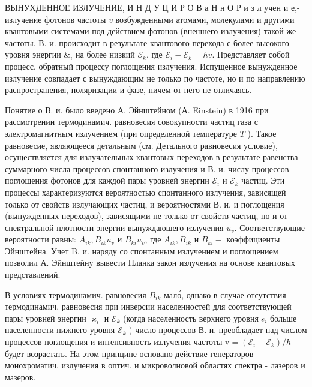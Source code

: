 \documentclass[10pt]{article}
\begin{document}
ВЫНУХДЕННОЕ ИЗЛУЧЕНИЕ, И Н Д У Ц И Р О В а Н н О Р и з л учен и е,- излучение фотонов частоты $v$ возбужденными атомами, молекулами и другими квантовыми системами под действием фотонов (внешнего излучения) такой же частоты. В. и. происходит в результате квантового перехода с более высокого уровня энергии $\mathscr{\&}_{i}$ на более низкий $\mathscr{E}_{k}$, где $\mathscr{E}_{i}-\mathscr{E}_{k}=h v$. Представляет собой процесс, обратный процессу поглощения излучения. Испущенное вынужденное излучение совпадает с вынуждающим не только по частоте, но и по направлению распространения, поляризации и фазе, ничем от него не отличаясь.



Понятие о В. и. было введено А. Эйнштейном (А. Einstein) в 1916 при рассмотрении термодинамич. равновесия совокупности частиц газа с электромагнитным излучением (при определенной температуре $T$ ). Такое равновесие, являющееся детальным (см. Детального равновесия условие), осуществляется для излучательных квантовых переходов в результате равенства суммарного числа процессов спонтанного излучения и В. и. числу процессов поглощения фотонов для каждой пары уровней энергии $\mathscr{E}_{i}$ и $\mathscr{E}_{k}$ частиц. Эти процессы характеризуются вероятностью спонтанного излучения, зависящей только от свойств излучающих частиц, и вероятностями В. и. и поглощения (вынужденных переходов), зависящими не только от свойств частиц, но и от спектральной плотности энергии вынуждаюшего излучения $u_{v}$. Соответствующие вероятности равны: $A_{i k}, B_{i k} u_{v}$ и $B_{k i} u_{v}$, где $A_{i k}, B_{i k}$ и $B_{k i}-$ коэффициенты Эйнштейна. Учет B. и. наряду со спонтанным излучением и поглощением позволил А. Эйнштейну вывести Планка закон излучения на основе квантовых представлений.



В условиях термодинамич. равновесия $B_{i k}$ мало́, однако в случае отсутствия термодинамич. равновесия при инверсии населенностей для соответствующей пары уровней энергии $\mathscr{\varkappa}_{i}$ и $\mathscr{E}_{k}$ (когда населенность верхнего уровня $\mathscr{c}_{i}$ больше населенности нижнего уровня $\mathscr{E}_{k}$ ) число процессов В. и. преобладает над числом процессов поглощения и интенсивность излучения частоты $\mathrm{v}=\left(\mathscr{E}_{i}-\mathscr{E}_{k}\right) / h$ будет возрастать. На этом принципе основано действие генераторов монохроматич. излучения в оптич. и микроволновой областях спектра - лазеров и мазеров.
\end{document}
